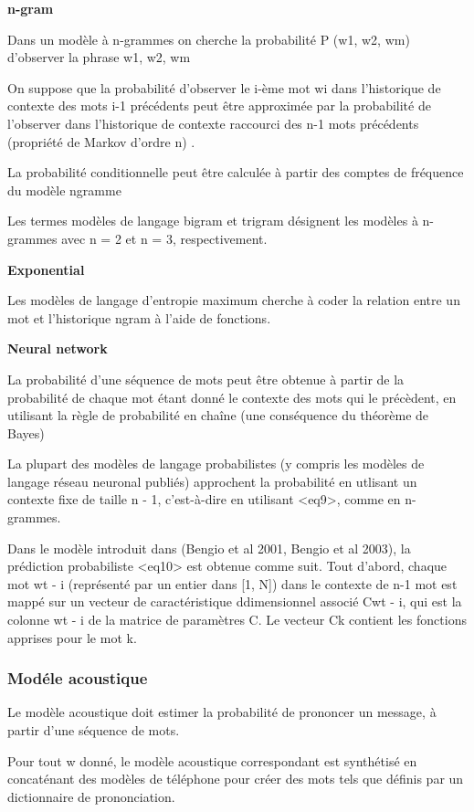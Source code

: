 \documentclass[a4paper, 12pt]{book}
\begin{document}
\textbf{n-gram}

Dans un modèle à n-grammes on cherche la probabilité P (w1, w2, wm) d’observer la phrase w1, w2, wm

On suppose que la probabilité d'observer le i-ème mot wi dans l'historique de contexte des mots i-1 précédents peut être approximée par la probabilité de l'observer dans l'historique de contexte raccourci des n-1 mots précédents (propriété de Markov d'ordre n) .

La probabilité conditionnelle peut être calculée à partir des comptes de fréquence du modèle ngramme


Les termes modèles de langage bigram et trigram désignent les modèles à n-grammes avec n = 2 et n = 3, respectivement.

\textbf{Exponential}

Les modèles de langage d'entropie maximum cherche à coder la relation entre un mot et l'historique ngram à l'aide de fonctions.

\textbf{Neural network}

La probabilité d'une séquence de mots peut être obtenue à partir de la probabilité de chaque mot étant donné le contexte des mots qui le précèdent, en utilisant la règle de probabilité en chaîne (une conséquence du théorème de Bayes)

La plupart des modèles de langage probabilistes (y compris les modèles de langage réseau neuronal publiés) approchent la probabilité en utlisant un contexte fixe de taille n - 1, c'est-à-dire en utilisant <eq9>, comme en n-grammes.

Dans le modèle introduit dans (Bengio et al 2001, Bengio et al 2003), la prédiction probabiliste <eq10> est obtenue comme suit. Tout d'abord, chaque mot wt - i (représenté par un entier dans [1, N]) dans le contexte de n-1 mot est mappé sur un vecteur de caractéristique ddimensionnel associé Cwt - i, qui est la colonne wt - i de la matrice de paramètres C. Le vecteur Ck contient les fonctions apprises pour le mot k. 



\subsubsection{Modéle acoustique}

Le modèle acoustique doit estimer la probabilité de prononcer un message, à partir d'une séquence de mots.

Pour tout w donné, le modèle acoustique correspondant est synthétisé en concaténant des modèles de téléphone pour créer des mots tels que définis par un dictionnaire de prononciation.
\end{document}

